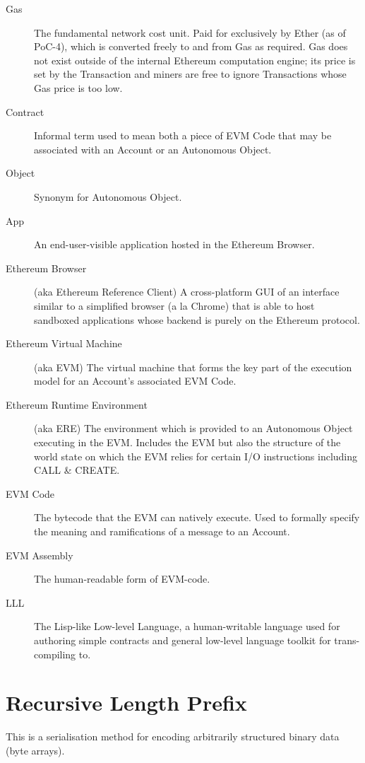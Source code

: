 \documentclass[9pt,oneside]{amsart}
\begin{document}
\begin{description}
\item[Gas] The fundamental network cost unit. Paid for exclusively by Ether (as of PoC-4), which is converted freely to and from Gas as required. Gas does not exist outside of the internal Ethereum computation engine; its price is set by the Transaction and miners are free to ignore Transactions whose Gas price is too low.

\item[Contract] Informal term used to mean both a piece of EVM Code that may be associated with an Account or an Autonomous Object.

\item[Object] Synonym for Autonomous Object.

\item[App] An end-user-visible application hosted in the Ethereum Browser.

\item[Ethereum Browser] (aka Ethereum Reference Client) A cross-platform GUI of an interface similar to a simplified browser (a la Chrome) that is able to host sandboxed applications whose backend is purely on the Ethereum protocol.

\item[Ethereum Virtual Machine] (aka EVM) The virtual machine that forms the key part of the execution model for an Account's associated EVM Code.

\item[Ethereum Runtime Environment] (aka ERE) The environment which is provided to an Autonomous Object executing in the EVM. Includes the EVM but also the structure of the world state on which the EVM relies for certain I/O instructions including CALL \& CREATE.

\item[EVM Code] The bytecode that the EVM can natively execute. Used to formally specify the meaning and ramifications of a message to an Account.

\item[EVM Assembly] The human-readable form of EVM-code.

\item[LLL] The Lisp-like Low-level Language, a human-writable language used for authoring simple contracts and general low-level language toolkit for trans-compiling to.

\end{description}

\section{Recursive Length Prefix}\label{app:rlp}
This is a serialisation method for encoding arbitrarily structured binary data (byte arrays).
\end{document}
